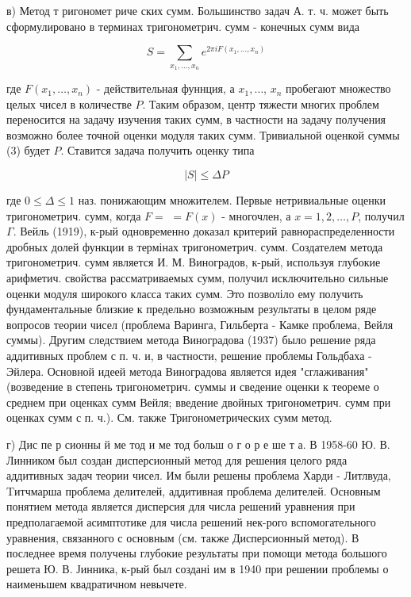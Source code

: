 \documentclass[10pt]{article}
\begin{document}
в) Метод т ригономет риче ских сумм. Большинство задач А. т. ч. может быть сформулировано в терминах тригонометрич. сумм - конечных сумм вида



\[

S=\sum_{x_{1}, \ldots, x_{n}} e^{2 \pi i F\left(x_{1}, \ldots, x_{n}\right)}

\]



где $F\left(x_{1}, \ldots, x_{n}\right)$ - действительная фуннция, а $x_{1}, \ldots$, $x_{n}$ пробегают множество целых чисел в количестве $P$. Таким образом, центр тяжести многих проблем переносится на задачу изучения таких сумм, в частности на задачу получения возможно более точной оценки модуля таких сумм. Тривиальной оценкой суммы (3) будет $P$. Ставится задача получить оценку типа



\[

|S| \leqslant \Delta P

\]



где $0 \leqslant \Delta \leqslant 1$ наз. понижающим множителем. Первые нетривиальные оценки тригонометрич. сумм, когда $F=$ $=F(x)$ - многочлен, а $x=1,2, \ldots, P$, получил $\Gamma$. Вейль (1919), к-рый одновременно доказал критерий равнораспределенности дробных долей функции в термінах тригонометрич. сумм. Создателем метода тригонометрич. сумм является И. М. Виноградов, к-рый, используя глубокие арифметич. свойства рассматриваемых сумм, получил исключительно сильные оценки модуля широкого класса таких сумм. Это позволіло ему получить фундаментальные близкие к предельно возможным результаты в целом ряде вопросов теории чисел (проблема Варинга, Гильберта - Камке проблема, Вейля суммы). Другим следствием метода Виноградова (1937) было решение ряда аддитивных проблем с п. ч. и, в частности, решение проблемы Гольдбаха - Эйлера. Основной идеей метода Виноградова является идея "сглаживания" (возведение в степень тригонометрич. суммы и сведение оценки к теореме о среднем при оценках сумм Вейля; введение двойных тригонометрич. сумм при оценках сумм с п. ч.). См. также Тригонометрических сумм метод.



г) Дис пе р сионны й ме тод и ме тод больш о г о р е ше т а. В 1958-60 Ю. В. Линником был создан дисперсионный метод для решения целого ряда аддитивных задач теории чисел. Им были решены проблема Харди - Литлвуда, Tитчмарша проблема делителей, аддитивная проблема делителей. Основным понятием метода является дисперсия для числа решений уравнения при предполагаемой асимптотике для числа решений нек-рого вспомогательного уравнения, связанного с основным (см. также Дисперсионный метод). В последнее время получены глубокие результаты при помощи метода большого решета Ю. В. Јинника, к-рый был создані им в 1940 при решении проблемы о наименьшем квадратичном невычете.
\end{document}
